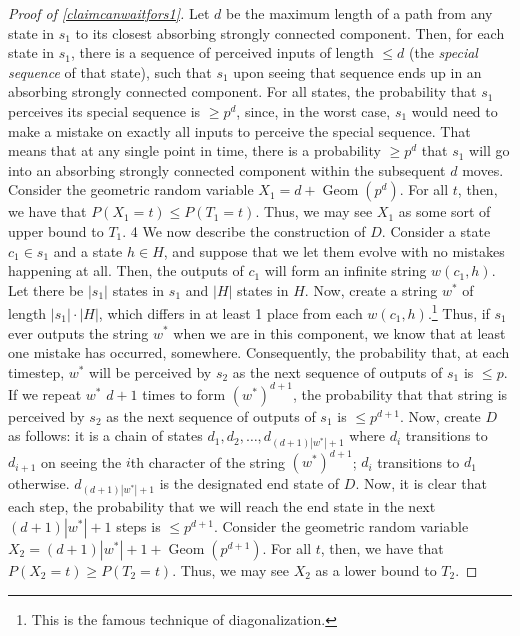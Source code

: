 \documentclass[12pt]{article}
\theoremstyle{definition}
\theoremstyle{remark}
\begin{document}
\begin{proof}[Proof of \cref{claimcanwaitfors1}]
        Let $d$ be the maximum length of a path from any state in $s_1$ to its closest absorbing strongly connected component. Then, for each state in $s_1$, there is a sequence of perceived inputs of length $\leq d$ (the \textit{special sequence} of that state), such that $s_1$ upon seeing that sequence ends up in an absorbing strongly connected component. For all states, the probability that $s_1$ 
        perceives its special sequence is $\geq p^d$, since, in the worst case, $s_1$ would need to make a mistake on exactly all 
        inputs to perceive the special sequence. That means that at any single point in time, there is a probability $\geq p^d$ that $s_1$ 
        will go into an absorbing strongly connected component within the subsequent $d$ moves. Consider the geometric random variable $X_1 = d + \operatorname{Geom} (p^d)$. For all $t$, then, we have that $P(X_1 = t) \leq P(T_1 = t)$. Thus, we may see $X_1$ as some sort of upper bound to $T_1$.
4
        We now describe the construction of $D$. Consider a state $c_1 \in s_1$ and a state $h \in H$, and suppose that we let them evolve with no mistakes happening at all. Then, the outputs of $c_1$ will form an infinite string $w(c_1, h)$. Let there be $|s_1|$ states in $s_1$ and $|H|$ states in $H$. Now, create a string $w^*$ of length $|s_1| \cdot |H|$, which differs in at least 1 place from each $w(c_1,h)$.\footnote{This is the famous technique of diagonalization.} Thus, if $s_1$ ever outputs the string $w^*$ when we are in this component, we know that at least one mistake has occurred, somewhere. Consequently, the probability that, at each timestep, $w^*$ will be perceived by $s_2$ as the next sequence of outputs of $s_1$ is $\leq p$. 
        If we repeat $w^*$ $d+1$ times to form $(w^*)^{d+1}$, the probability that that string is perceived by $s_2$ as the next sequence of outputs of $s_1$ is $\leq p^{d+1}$.
        Now, create $D$ as follows: it is a chain of states $d_1,d_2,\ldots,d_{(d+1)|w^*|+1}$ where $d_i$ transitions to $d_{i+1}$ on seeing the $i$th character of the string $(w^*)^{d+1}$; $d_i$ transitions to $d_1$ otherwise. $d_{(d+1)|w^*|+1}$ is the designated end state of $D$. Now, it is clear that each step, the probability that we will reach the end state in the next $(d+1)|w^*|+1$ steps is $\leq p^{d+1}$. Consider the geometric random variable $X_2 = (d+1)|w^*| + 1 + \operatorname{Geom} (p^{d+1})$. For all $t$, then, we have that $P(X_2 = t) \geq P(T_2 = t)$. Thus, we may see $X_2$ as a lower bound to $T_2$.


\end{proof}
\end{document}
